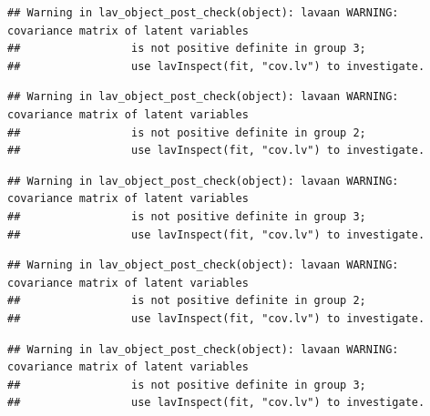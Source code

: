\documentclass[
  man]{apa6}
\begin{document}
\begin{verbatim}
## Warning in lav_object_post_check(object): lavaan WARNING: covariance matrix of latent variables
##                 is not positive definite in group 3;
##                 use lavInspect(fit, "cov.lv") to investigate.
\end{verbatim}

\begin{verbatim}
## Warning in lav_object_post_check(object): lavaan WARNING: covariance matrix of latent variables
##                 is not positive definite in group 2;
##                 use lavInspect(fit, "cov.lv") to investigate.
\end{verbatim}

\begin{verbatim}
## Warning in lav_object_post_check(object): lavaan WARNING: covariance matrix of latent variables
##                 is not positive definite in group 3;
##                 use lavInspect(fit, "cov.lv") to investigate.
\end{verbatim}

\begin{verbatim}
## Warning in lav_object_post_check(object): lavaan WARNING: covariance matrix of latent variables
##                 is not positive definite in group 2;
##                 use lavInspect(fit, "cov.lv") to investigate.
\end{verbatim}

\begin{verbatim}
## Warning in lav_object_post_check(object): lavaan WARNING: covariance matrix of latent variables
##                 is not positive definite in group 3;
##                 use lavInspect(fit, "cov.lv") to investigate.
\end{verbatim}
\end{document}
